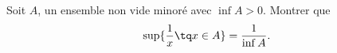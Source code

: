 

\begin{exercice}\label{exoSerieUn0011}

	Soit $A$, un ensemble non vide minoré avec $\inf A>0$. Montrer que 
	\begin{equation}
		\sup\{ \frac{1}{ x }\tq x\in A \}=\frac{1}{ \inf A }.
	\end{equation}
	

\end{exercice}
